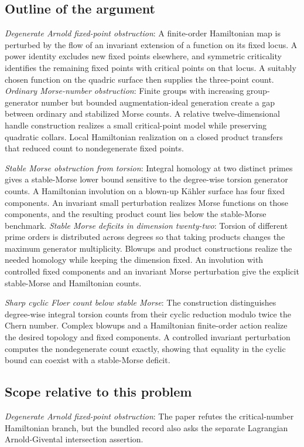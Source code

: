 \documentclass[11pt]{article}
\begin{document}
\subsection{Outline of the argument}
\textit{Degenerate Arnold fixed-point obstruction}: A finite-order Hamiltonian map is perturbed by the flow of an invariant extension of a function on its fixed locus. A power identity excludes new fixed points elsewhere, and symmetric criticality identifies the remaining fixed points with critical points on that locus. A suitably chosen function on the quadric surface then supplies the three-point count. \textit{Ordinary Morse-number obstruction}: Finite groups with increasing group-generator number but bounded augmentation-ideal generation create a gap between ordinary and stabilized Morse counts. A relative twelve-dimensional handle construction realizes a small critical-point model while preserving quadratic collars. Local Hamiltonian realization on a closed product transfers that reduced count to nondegenerate fixed points.

\textit{Stable Morse obstruction from torsion}: Integral homology at two distinct primes gives a stable-Morse lower bound sensitive to the degree-wise torsion generator counts. A Hamiltonian involution on a blown-up Kähler surface has four fixed components. An invariant small perturbation realizes Morse functions on those components, and the resulting product count lies below the stable-Morse benchmark. \textit{Stable Morse deficits in dimension twenty-two}: Torsion of different prime orders is distributed across degrees so that taking products changes the maximum generator multiplicity. Blowups and product constructions realize the needed homology while keeping the dimension fixed. An involution with controlled fixed components and an invariant Morse perturbation give the explicit stable-Morse and Hamiltonian counts.

\textit{Sharp cyclic Floer count below stable Morse}: The construction distinguishes degree-wise integral torsion counts from their cyclic reduction modulo twice the Chern number. Complex blowups and a Hamiltonian finite-order action realize the desired topology and fixed components. A controlled invariant perturbation computes the nondegenerate count exactly, showing that equality in the cyclic bound can coexist with a stable-Morse deficit.

\subsection{Scope relative to this problem}
\textit{Degenerate Arnold fixed-point obstruction}: The paper refutes the critical-number Hamiltonian branch, but the bundled record also asks the separate Lagrangian Arnold-Givental intersection assertion.
\end{document}
